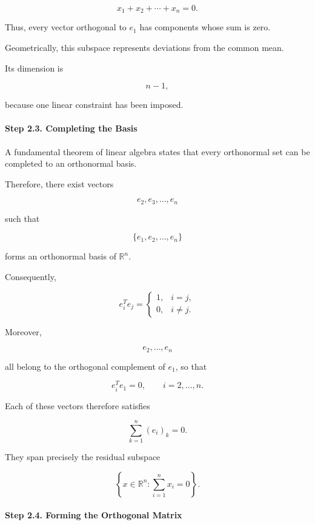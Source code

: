 \documentclass[11pt]{article}
\begin{document}
\begin{mdframed}[
		linewidth=0.8pt,
		roundcorner=6pt,
		backgroundcolor=gray!5,
		linecolor=gray!60,
		innertopmargin=10pt,
		innerbottommargin=10pt,
		innerleftmargin=10pt,
		innerrightmargin=10pt
		]
		\[
		\boxed{
			x_1+x_2+\cdots+x_n=0.
		}
		\]
		
		Thus, every vector orthogonal to $e_1$ has components whose sum is zero.
		
		Geometrically, this subspace represents deviations from the common mean.
		
		Its dimension is
		
		\[
		n-1,
		\]
		
		because one linear constraint has been imposed.
		
		\paragraph{Step 2.3. Completing the Basis}
		
		A fundamental theorem of linear algebra states that every orthonormal set
		can be completed to an orthonormal basis.
		
		Therefore, there exist vectors
		
		\[
		e_2,e_3,\ldots,e_n
		\]
		
		such that
		
		\[
		\boxed{
			\{e_1,e_2,\ldots,e_n\}
		}
		\]
		
		forms an orthonormal basis of $\mathbb R^n$.
		
		Consequently,
		
		\[
		e_i^Te_j=
		\begin{cases}
			1,&i=j,\\
			0,&i\neq j.
		\end{cases}
		\]
		
		Moreover,
		
		\[
		e_2,\ldots,e_n
		\]
		
		all belong to the orthogonal complement of $e_1$, so that
		
		\[
		e_i^Te_1=0,
		\qquad
		i=2,\ldots,n.
		\]
		
		Each of these vectors therefore satisfies
		
		\[
		\sum_{k=1}^{n}(e_i)_k=0.
		\]
		
		They span precisely the residual subspace
		
		\[
		\boxed{
			\left\{
			x\in\mathbb R^n:
			\sum_{i=1}^{n}x_i=0
			\right\}.
		}
		\]
		
		\paragraph{Step 2.4. Forming the Orthogonal Matrix}
		

\end{mdframed}
\end{document}
